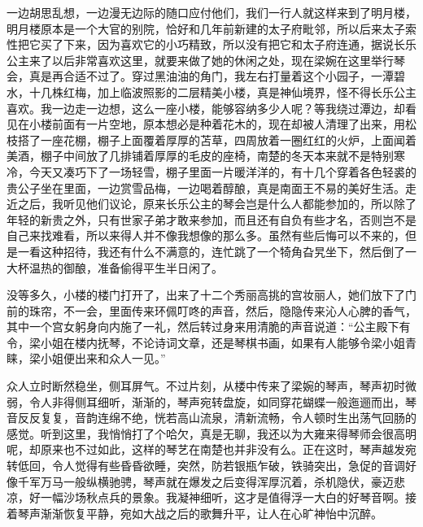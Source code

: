 一边胡思乱想，一边漫无边际的随口应付他们，我们一行人就这样来到了明月楼，明月楼原本是一个大官的别院，恰好和几年前新建的太子府毗邻，所以后来太子索性把它买了下来，因为喜欢它的小巧精致，所以没有把它和太子府连通，据说长乐公主来了以后非常喜欢这里，就要来做了她的休闲之处，现在梁婉在这里举行琴会，真是再合适不过了。穿过黑油油的角门，我左右打量着这个小园子，一潭碧水，十几株红梅，加上临波照影的二层精美小楼，真是神仙境界，怪不得长乐公主喜欢。我一边走一边想，这么一座小楼，能够容纳多少人呢？等我绕过潭边，却看见在小楼前面有一片空地，原本想必是种着花木的，现在却被人清理了出来，用松枝搭了一座花棚，棚子上面覆着厚厚的苫草，四周放着一圈红红的火炉，上面闻着美酒，棚子中间放了几排铺着厚厚的毛皮的座椅，南楚的冬天本来就不是特别寒冷，今天又凑巧下了一场轻雪，棚子里面一片暖洋洋的，有十几个穿着各色轻裘的贵公子坐在里面，一边赏雪品梅，一边喝着醇酿，真是南面王不易的美好生活。走近之后，我听见他们议论，原来长乐公主的琴会岂是什么人都能参加的，所以除了年轻的新贵之外，只有世家子弟才敢来参加，而且还有自负有些才名，否则岂不是自己来找难看，所以来得人并不像我想像的那么多。虽然有些后悔可以不来的，但是一看这种招待，我还有什么不满意的，连忙跳了一个犄角旮旯坐下，然后倒了一大杯温热的御酿，准备偷得平生半日闲了。

没等多久，小楼的楼门打开了，出来了十二个秀丽高挑的宫妆丽人，她们放下了门前的珠帘，不一会，里面传来环佩叮咚的声音，然后，隐隐传来沁人心脾的香气，其中一个宫女躬身向内施了一礼，然后转过身来用清脆的声音说道：“公主殿下有令，梁小姐在楼内抚琴，不论诗词文章，还是琴棋书画，如果有人能够令梁小姐青睐，梁小姐便出来和众人一见。”

众人立时断然稳坐，侧耳屏气。不过片刻，从楼中传来了梁婉的琴声，琴声初时微弱，令人非得侧耳细听，渐渐的，琴声宛转盘旋，如同穿花蝴蝶一般迤逦而出，琴音反反复复，音韵连绵不绝，恍若高山流泉，清新流畅，令人顿时生出荡气回肠的感觉。听到这里，我悄悄打了个哈欠，真是无聊，我还以为大雍来得琴师会很高明呢，却原来也不过如此，这样的琴艺在南楚也并非没有么。正在这时，琴声越发宛转低回，令人觉得有些昏昏欲睡，突然，防若银瓶乍破，铁骑突出，急促的音调好像千军万马一般纵横驰骋，琴声就在爆发之后变得浑厚沉着，杀机隐伏，豪迈悲凉，好一幅沙场秋点兵的景象。我凝神细听，这才是值得浮一大白的好琴音啊。接着琴声渐渐恢复平静，宛如大战之后的歌舞升平，让人在心旷神怡中沉醉。

